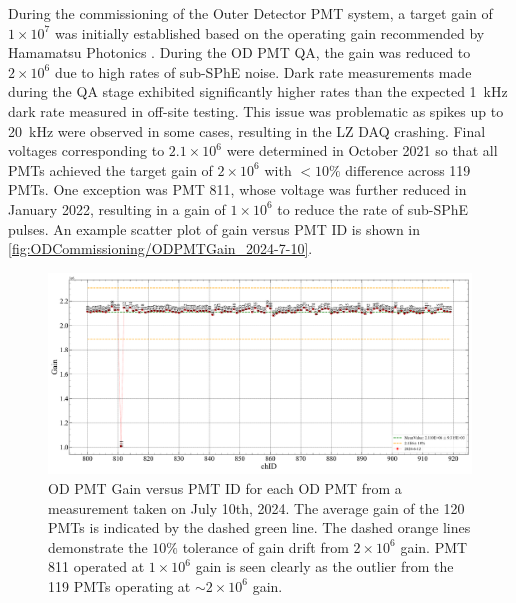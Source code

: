 During the commissioning of the Outer Detector PMT system, a target gain of $1\times10^{7}$ was initially established based on the operating gain recommended by Hamamatsu Photonics \cite{LZTDR,HamamatsuR5912}. During the OD PMT QA, the gain was reduced to $2\times10^{6}$ due to high rates of sub-SPhE noise. Dark rate measurements made during the QA stage exhibited significantly higher rates than the expected 1~kHz dark rate measured in off-site testing. This issue was problematic as spikes up to 20~kHz were observed in some cases, resulting in the LZ DAQ crashing. Final voltages corresponding to $2.1\times10^{6}$ were determined in October 2021 so that all PMTs achieved the target gain of $2\times10^6$ with $<10\%$ difference across 119 PMTs. One exception was PMT 811, whose voltage was further reduced in January 2022, resulting in a gain of $1\times10^6$ to reduce the rate of sub-SPhE pulses.
An example scatter plot of gain versus PMT ID is shown in \autoref{fig:ODCommissioning/ODPMTGain_2024-7-10}.

\begin{figure}[ht!]
    \centering
    \includegraphics[width=\textwidth]{figures/ODCommissioning/2024-6-12_ODPMT_Gain.pdf}
    \caption[OD PMT Gain versus PMT ID for each OD PMT.]{OD PMT Gain versus PMT ID for each OD PMT from a measurement taken on July 10th, 2024. The average gain of the 120 PMTs is indicated by the dashed green line. The dashed orange lines demonstrate the $10\%$ tolerance of gain drift from $2\times10^6$ gain. PMT 811 operated at $1\times10^6$ gain is seen clearly as the outlier from the 119 PMTs operating at $\sim2\times10^6$ gain.}
    \label{fig:ODCommissioning/ODPMTGain_2024-7-10}
\end{figure}

